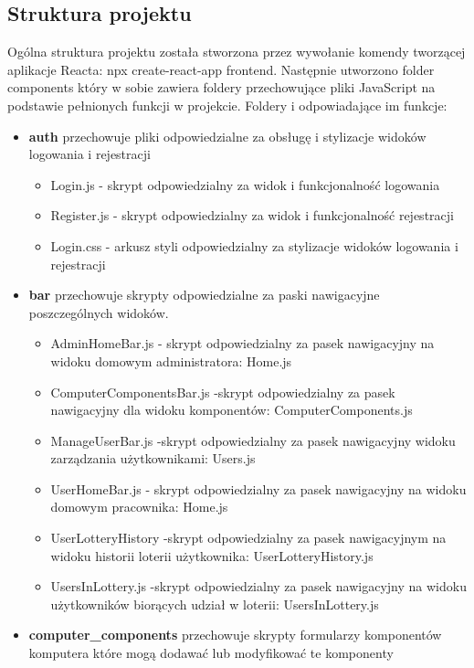 \subsection{Struktura projektu}
Ogólna struktura projektu została stworzona przez wywołanie komendy tworzącej aplikacje Reacta: npx create-react-app frontend. Następnie utworzono folder components który w sobie zawiera foldery przechowujące pliki JavaScript na podstawie pełnionych funkcji w projekcie. Foldery i odpowiadające im funkcje: 
\begin {itemize}
\item \textbf{auth} przechowuje pliki odpowiedzialne za obsługę i stylizacje widoków logowania i rejestracji
	\begin{itemize}
	\item Login.js - skrypt odpowiedzialny za widok i funkcjonalność logowania
	\item Register.js - skrypt odpowiedzialny za widok i funkcjonalność rejestracji
	\item Login.css - arkusz styli odpowiedzialny za stylizacje widoków logowania i rejestracji
	\end{itemize}
\item \textbf{bar} przechowuje skrypty odpowiedzialne za paski nawigacyjne poszczególnych widoków.
	\begin{itemize}
	\item AdminHomeBar.js - skrypt odpowiedzialny za pasek nawigacyjny na widoku domowym administratora: Home.js
	\item ComputerComponentsBar.js -skrypt odpowiedzialny za pasek nawigacyjny dla widoku komponentów: ComputerComponents.js
	\item ManageUserBar.js -skrypt odpowiedzialny za pasek nawigacyjny widoku zarządzania użytkownikami: Users.js
	\item UserHomeBar.js - skrypt odpowiedzialny za pasek nawigacyjny na widoku domowym pracownika: Home.js
	\item UserLotteryHistory -skrypt odpowiedzialny za pasek nawigacyjnym na widoku historii loterii użytkownika: UserLotteryHistory.js
	\item UsersInLottery.js -skrypt odpowiedzialny za pasek nawigacyjny na widoku użytkowników biorących udział w loterii: UsersInLottery.js
	\end{itemize}
\item \textbf{computer\_components} przechowuje skrypty formularzy komponentów komputera które mogą dodawać lub modyfikować te komponenty
	\begin{itemize}

\end{itemize}
\end{itemize}
